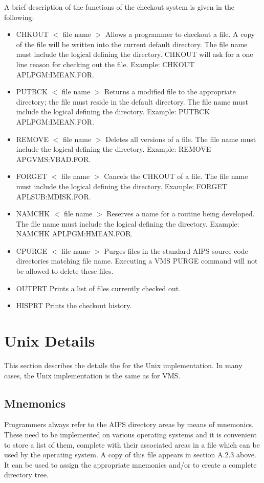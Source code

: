 A brief description of the functions of the checkout system is given
in the following:
\begin{itemize}  %
\item CHKOUT $<$ file name $>$ Allows a programmer to checkout a file.
A copy of the file will be written into the current default directory.
The file name must include the logical defining the directory.
CHKOUT will ask for a one line reason for checking out the file.
Example: CHKOUT APLPGM:IMEAN.FOR.
\item PUTBCK $<$ file name $>$ Returns a modified file to the
appropriate directory; the file must reside in the default directory.
The file name must include the logical defining the directory.
Example: PUTBCK APLPGM:IMEAN.FOR.
\item REMOVE $<$ file name $>$ Deletes all versions of a file.
The file name must include the logical defining the directory.
Example: REMOVE APGVMS:VBAD.FOR.
\item FORGET $<$ file name $>$ Cancels the CHKOUT of a file.
The file name must include the logical defining the directory.
Example: FORGET APLSUB:MDISK.FOR.
\item NAMCHK $<$ file name $>$ Reserves a name for a routine being
developed. The file name must include the logical defining the
directory. Example: NAMCHK APLPGM:HMEAN.FOR.
\item CPURGE $<$ file name $>$ Purges files in the standard AIPS
source code directories matching file name.  Executing a VMS PURGE
command will not be allowed to delete these files.
\item OUTPRT Prints a list of files currently checked out.
\item HISPRT Prints the checkout history.
\end{itemize}  %


\section{Unix Details}
This section describes the details the for the Unix implementation. In
many cases, the Unix implementation is the same as for VMS.

\subsection{Mnemonics}
Programmers always refer to the AIPS directory areas by means of
mnemonics. These need to be implemented on various operating systems
and it is convenient to store a list of them, complete with their
associated areas in a file which can be used by the operating system.
A copy of this file appears in section A.2.3
above. It can be used to assign the appropriate mnemonics and/or to
create a complete directory tree.

